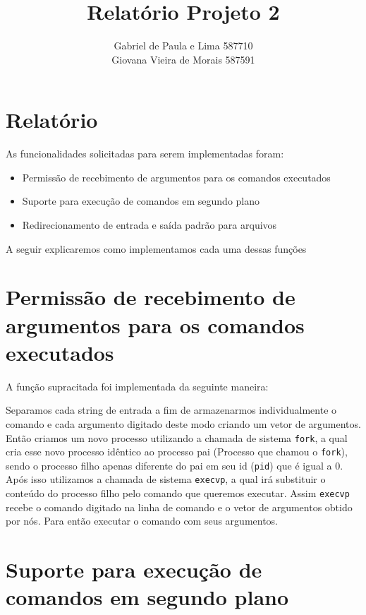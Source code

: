 \documentclass[12pt]{article}
\author{Gabriel de Paula e Lima  587710\\
        Giovana Vieira de Morais  587591}
\title{Relatório Projeto 2}
\begin{document}
\maketitle

\newpage

\section*{Relatório}

As funcionalidades solicitadas para serem implementadas foram:

\begin{itemize}
\item{Permissão de recebimento de argumentos para os comandos executados}
\item{Suporte para execução de comandos em segundo plano}
\item{Redirecionamento de entrada e saída padrão para arquivos}
\end{itemize}

A seguir explicaremos como implementamos cada uma dessas funções

\section*{Permissão de recebimento de argumentos para os comandos executados}
 A função supracitada foi implementada da seguinte maneira:

 Separamos cada string de entrada a fim de armazenarmos individualmente o comando e cada argumento digitado
 deste modo criando um vetor de argumentos.
 Então criamos um novo processo utilizando a chamada de sistema \texttt{fork},
 a qual cria esse novo processo idêntico ao processo pai (Processo que chamou o \texttt{fork}),
 sendo o processo filho apenas diferente do pai em seu id (\texttt{pid}) que é igual a 0.
 Após isso utilizamos a chamada de sistema \texttt{execvp},
 a qual irá substituir o conteúdo do processo filho pelo comando que queremos executar.
 Assim \texttt{execvp} recebe o comando digitado na linha de comando e o vetor de argumentos obtido por nós.
 Para então executar o comando com seus argumentos.

\section*{Suporte para execução de comandos em segundo plano}



%

\end{document}
